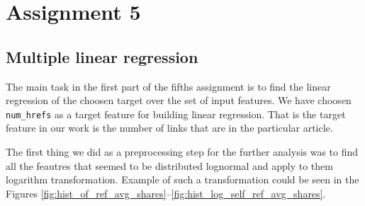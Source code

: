\section{Assignment 5}
\subsection{Multiple linear regression}
The main task in the first part of the fifths assignment is to find the linear regression of the choosen target over the set of input features.
We have choosen \texttt{num\_hrefs} as a target feature for building linear regression. That is the target feature  in our work is the  number of links that are in the particular article. 

The first thing we did as a preprocessing step for the further analysis was to find all the feautres that seemed to be distributed lognormal and apply to them logarithm transformation.
Example of such a transformation could be seen in the Figures \ref{fig:hist_of_ref_avg_shares}--\ref{fig:hist_log_self_ref_avg_shares}.
 
